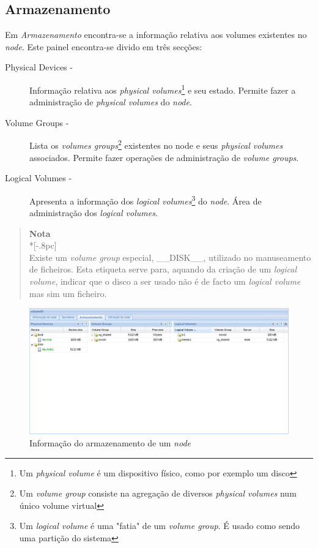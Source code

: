 \subsection{Armazenamento}
\label{sec:storage}

Em \emph{Armazenamento} encontra-se a informação relativa aos volumes existentes no \emph{node}.
Este painel encontra-se divido em três secções:

\begin{description}
	\item[Physical Devices -] Informação relativa aos \emph{physical volumes}\footnote{Um \emph{physical volume} é um dispositivo físico, como por exemplo um disco} e seu estado. Permite fazer a administração de \emph{physical volumes} do \emph{node}.
	\item[Volume Groups -] Lista os \emph{volumes groups}\footnote{Um \emph{volume group} consiste na agregação de diversos \emph{physical volumes} num único volume virtual} existentes no node e seus \emph{physical volumes} associados. Permite fazer operações de administração de \emph{volume groups}.
	\item[Logical Volumes -] Apresenta a informação dos \emph{logical volumes}\footnote{Um \emph{logical volume} é uma "fatia" de um \emph{volume group}. É usado como sendo uma partição do sistema} do \emph{node}. Área de administração dos \emph{logical volumes}.
\end{description}


\begin{quote}
	{\large \bf Nota} \\*[-.8pc]
	\underline{\hspace{6in}} \\
	Existe um \emph{volume group} especial, \_\_DISK\_\_, utilizado no manuseamento de ficheiros. Esta etiqueta serve para, aquando da criação de um \emph{logical volume}, indicar que o disco a ser usado não é de facto um \emph{logical volume} mas sim um ficheiro.
\end{quote}


\begin{figure}[H]
	\begin{center}
	\includegraphics[scale=0.45]{screenshots/node_storage.png}
	\caption{Informação do armazenamento de um \emph{node}}
	\label{fig:inicial}
	\end{center}
\end{figure}


